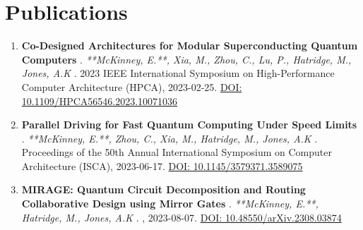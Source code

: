 \documentclass[letterpaper, 10pt]{article}
\begin{document}
\section*{Publications}

\begin{enumerate}
    \item \textbf{ Co-Designed Architectures for Modular Superconducting Quantum Computers }. \textit{ **McKinney, E.**, Xia, M., Zhou, C., Lu, P., Hatridge, M., Jones, A.K }. 2023 IEEE International Symposium on High-Performance Computer Architecture (HPCA), 2023-02-25. \href{https://doi.org/10.1109/HPCA56546.2023.10071036 }{DOI: 10.1109/HPCA56546.2023.10071036}
    \item \textbf{ Parallel Driving for Fast Quantum Computing Under Speed Limits }. \textit{ **McKinney, E.**, Zhou, C., Xia, M., Hatridge, M., Jones, A.K }. Proceedings of the 50th Annual International Symposium on Computer Architecture (ISCA), 2023-06-17. \href{https://doi.org/10.1145/3579371.3589075 }{DOI: 10.1145/3579371.3589075}
    \item \textbf{ MIRAGE: Quantum Circuit Decomposition and Routing Collaborative Design using Mirror Gates }. \textit{ **McKinney, E.**, Hatridge, M., Jones, A.K }. , 2023-08-07. \href{https://doi.org/10.48550/arXiv.2308.03874 }{DOI: 10.48550/arXiv.2308.03874}
\end{enumerate}
\end{document}
